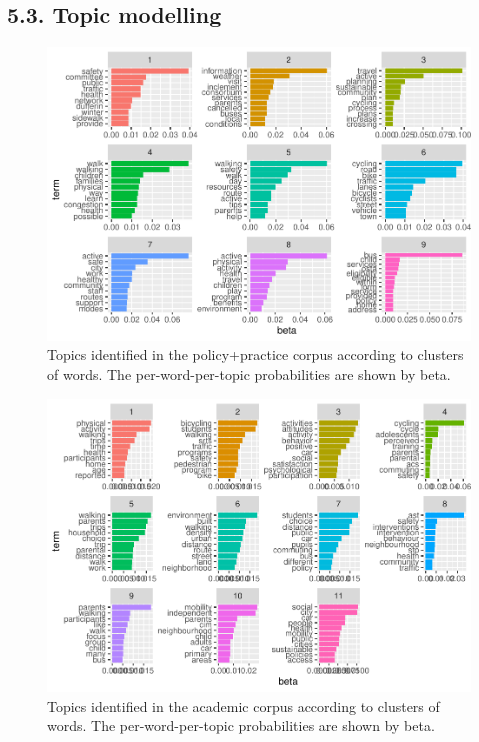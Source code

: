 \documentclass[]{elsarticle} %
\begin{document}
\hypertarget{topic-modelling}{%
\subsection{5.3. Topic modelling}\label{topic-modelling}}

\begin{figure}
\includegraphics[width=1\linewidth]{AST-Framing-Ontario_files/figure-latex/policy-terms-1} \caption{\label{fig:policy-terms}Topics identified in the policy+practice corpus according to clusters of words. The per-word-per-topic probabilities are shown by beta.}\label{fig:policy-terms}
\end{figure}

\begin{figure}
\includegraphics[width=1\linewidth]{AST-Framing-Ontario_files/figure-latex/academic-terms-1} \caption{\label{fig:academic-terms}Topics identified in the academic corpus according to clusters of words. The per-word-per-topic probabilities are shown by beta.}\label{fig:academic-terms}
\end{figure}
\end{document}
